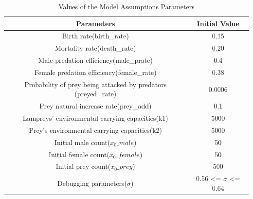 \documentclass[12pt]{article}  %
\begin{document}
\begin{table}[htbp]
\begin{center}
	\caption{Values of the Model Assumptions Parameters}
	\resizebox{\textwidth}{!}
	{\begin{tabular}{c c}
			\toprule[2pt]
			\multicolumn{1}{m{8cm}}{\centering \textbf{Parameters}}
			&\multicolumn{1}{m{5cm}}{\centering \textbf{Initial Value} }\\ %
			\midrule
			Birth rate(birth\_rate) & 0.15 \\
			Mortality rate(death\_rate) & 0.20 \\
			Male predation efficiency(male\_prate) & 0.4 \\
			Female predation efficiency(female\_rate) & 0.38 \\
			Probability of prey being attacked by predators (preyed\_rate) & 0.0006 \\
			Prey natural increase rate(prey\_add) & 0.1 \\
			Lampreys' environmental carrying capacities(k1) & 5000\\
			Prey's environmental carrying capacities(k2) & 5000\\
			Initial male count($x_0\_male$) & 50 \\
			Initial female count($x_0\_female$) & 50 \\
			Initial prey count($x_0\_prey$) & 500 \\
			Debugging parameters($\sigma$) & 0.56 <= $\sigma$ <= 0.64  \\
			\bottomrule[2pt]
	\end{tabular}}
\end{center}
\end{table}
\end{document}

